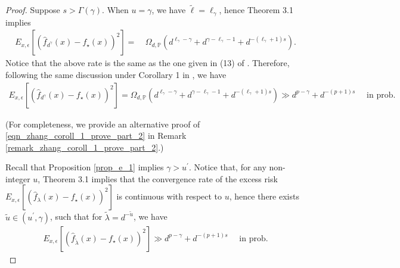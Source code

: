 \documentclass{article}
\theoremstyle{plain}
\theoremstyle{definition}
\theoremstyle{remark}
\begin{document}
\begin{appendix}
\begin{proof}
 Suppose $s > \Gamma(\gamma)$. 
When $u=\gamma$, we have $\tilde{\ell}=\ell_{\gamma}$, hence Theorem 3.1 implies
\begin{equation*}
    \begin{aligned}
        E_{x, \epsilon} \left[ \left(\hat{f}_{d^{\gamma}}(x) - f_{\star}(x) \right)^{2} \right]
        =&~
        \Omega_{d, \mathbb{P}} \left( d^{\ell_{\gamma} - \gamma} + d^{\gamma - \ell_{\gamma} - 1} + d^{-(\ell_{\gamma} + 1)  s}\right).
    \end{aligned}
\end{equation*}
Notice that the above rate is the same as the one given in (13) of \cite{zhang2024phase}. Therefore, following the same discussion under Corollary 1 in \cite{zhang2024phase}, we have 
\begin{equation}\label{eqn_zhang_coroll_1_prove_part_2}
    \begin{aligned}
        E_{x, \epsilon} \left[ \left(\hat{f}_{d^{\gamma}}(x) - f_{\star}(x) \right)^{2} \right]
        = \Omega_{d, \mathbb{P}} \left( d^{\ell_{\gamma} - \gamma} + d^{\gamma - \ell_{\gamma} - 1} + d^{-(\ell_{\gamma} + 1)  s}\right) \gg d^{p-\gamma} + 
    d^{-(p+1)s}
 \quad \text{ in prob.}
    \end{aligned}
\end{equation}

(For completeness, we provide an alternative proof of \eqref{eqn_zhang_coroll_1_prove_part_2} in Remark \ref{remark_zhang_coroll_1_prove_part_2}.)




Recall that Proposition \ref{prop_e_1} implies $\gamma > u^{\prime}$.
Notice that, for any non-integer $u$, Theorem 3.1 implies that the convergence rate of the excess risk $E_{x, \epsilon} \left[ \left(\hat{f}_{\lambda}(x) - f_{\star}(x) \right)^{2} \right]$ is continuous with respect to $u$, hence there exists $\tilde{u} \in (u^{\prime}, \gamma)$, such that for $\tilde{\lambda}=d^{-\tilde{u}}$, we have
\begin{equation*}
\begin{aligned}
    E_{x, \epsilon} \left[ \left(\hat{f}_{\tilde{\lambda}}(x) - f_{\star}(x) \right)^{2} \right]
 \gg  
d^{p-\gamma} + 
    d^{-(p+1)s} \quad \text{ in prob.}
\end{aligned}
\end{equation*}
\end{proof}


\end{appendix}
\end{document}
